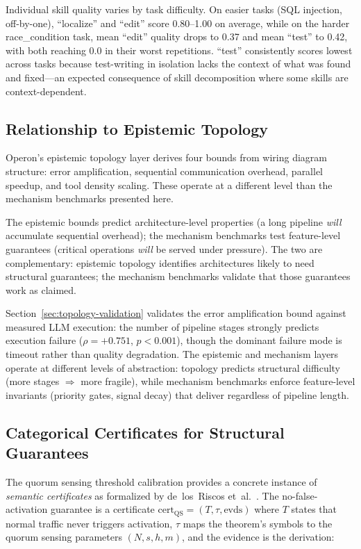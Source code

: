 Individual skill quality varies by task difficulty.  On easier tasks
(SQL injection, off-by-one), ``localize'' and ``edit'' score
0.80--1.00 on average, while on the harder race\_condition task,
mean ``edit'' quality drops to 0.37 and mean ``test'' to 0.42,
with both reaching 0.0 in their worst repetitions.  ``test''
consistently scores lowest across tasks because test-writing in
isolation lacks the context of what was found and fixed---an
expected consequence of skill decomposition where some skills
are context-dependent.

\subsection{Relationship to Epistemic Topology}

Operon's epistemic topology layer derives four bounds from wiring
diagram structure: error amplification, sequential communication
overhead, parallel speedup, and tool density scaling.  These
operate at a different level than the mechanism benchmarks presented
here.

The epistemic bounds predict architecture-level properties (a long
pipeline \emph{will} accumulate sequential overhead); the mechanism
benchmarks test feature-level guarantees (critical operations
\emph{will} be served under pressure).  The two are complementary:
epistemic topology identifies architectures likely to need structural
guarantees; the mechanism benchmarks validate that those guarantees
work as claimed.

Section~\ref{sec:topology-validation} validates the error amplification
bound against measured LLM execution: the number of pipeline stages
strongly predicts execution failure ($\rho = +0.751$, $p < 0.001$),
though the dominant failure mode is timeout rather than quality
degradation.  The epistemic and mechanism layers operate at different
levels of abstraction: topology predicts structural difficulty (more
stages $\Rightarrow$ more fragile), while mechanism benchmarks enforce
feature-level invariants (priority gates, signal decay) that deliver
regardless of pipeline length.

\subsection{Categorical Certificates for Structural Guarantees}

The quorum sensing threshold calibration provides a concrete instance
of \emph{semantic certificates} as formalized by de~los~Riscos
et~al.~\cite{delosriscos2026categorical}.  The no-false-activation
guarantee is a certificate $\text{cert}_\text{QS} = (T, \tau, \text{evds})$
where $T$ states that normal traffic never triggers activation,
$\tau$ maps the theorem's symbols to the quorum sensing parameters
$(N, s, h, m)$, and the evidence is the derivation:


